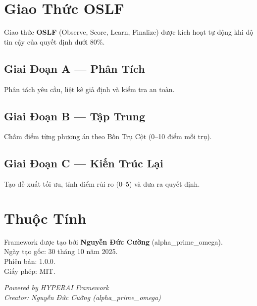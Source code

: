 \documentclass[12pt,a4paper]{article}
\begin{document}
\section{Giao Thức OSLF}

Giao thức \textbf{OSLF} (Observe, Score, Learn, Finalize) được kích hoạt tự động
khi độ tin cậy của quyết định dưới 80\%.

\subsection{Giai Đoạn A — Phân Tích}
Phân tách yêu cầu, liệt kê giả định và kiểm tra an toàn.

\subsection{Giai Đoạn B — Tập Trung}
Chấm điểm từng phương án theo Bốn Trụ Cột (0--10 điểm mỗi trụ).

\subsection{Giai Đoạn C — Kiến Trúc Lại}
Tạo đề xuất tối ưu, tính điểm rủi ro (0--5) và đưa ra quyết định.

\section{Thuộc Tính}

Framework được tạo bởi \textbf{Nguyễn Đức Cường} (alpha\_prime\_omega).\\
Ngày tạo gốc: 30 tháng 10 năm 2025.\\
Phiên bản: 1.0.0.\\
Giấy phép: MIT.

\bigskip
\begin{center}
  \textit{Powered by HYPERAI Framework}\\
  \textit{Creator: Nguyễn Đức Cường (alpha\_prime\_omega)}
\end{center}
\end{document}

